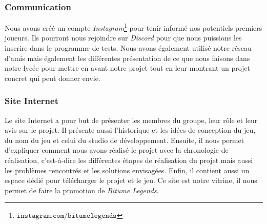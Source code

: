 \documentclass[a4paper,12pt]{article}
\newcommand{\btmlgs}{\textsl{Bitume Legends}}
\begin{document}
            \subsubsection{Communication}
                Nous avons créé un compte \textsl{Instagram}\footnote{\(\mathtt{instagram.com/bitumelegends}\)}
                pour tenir informé nos potentiels premiers joueurs. 
                Ils pourront nous rejoindre sur \textsl{Discord} pour que nous puissions les inscrire dans le
                programme de tests. Nous avons également utilisé notre réseau d'amis mais également les différentes 
                présentation de ce que nous faisons dans notre lycée pour mettre en avant notre projet tout en leur 
                montrant un projet concret qui peut donner envie.
        
            \subsubsection{Site Internet}
                Le site Internet a pour but de présenter les membres du groupe, leur rôle et leur avis sur le projet.
                Il présente aussi l'historique et les idées de conception du jeu, du nom du jeu et celui du studio
                de développement. Ensuite, il nous permet d'expliquer comment nous avons réalisé le projet avec la
                chronologie de réalisation, c'est-à-dire les différentes étapes de réalisation du projet mais aussi
                les problèmes rencontrés et les solutions envisagées. Enfin, il contient aussi
                un espace dédié pour télécharger le projet et le jeu. Ce site est notre vitrine, il nous permet de 
                faire la promotion de \btmlgs.
        
\end{document}
